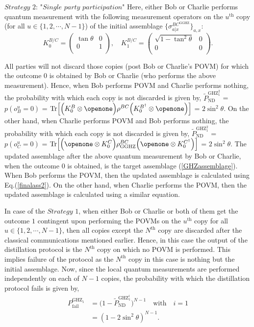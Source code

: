 \documentclass[reprint,superscriptaddress,nofootinbib,amsmath,amssymb,aps,pra,longbibliography]{revtex4-1}
\begin{document}
$\textit{Strategy 2: "Single party participation"}$ Here, either Bob or Charlie performs quantum measurement with the following measurement operators on the $u^{\text{th}}$ copy (for all $u \in \{1, 2, \cdots, N-1\}$) of the initial assemblage $\{\sigma_{a|x}^{BC^{\text{GGHZ}}}\}_{a,x}$:
\begin{equation}
	K_{0}^{B/C} = \left(
\begin{array}{cc}
 \tan \theta  & 0 \\
 0 & 1 \\
\end{array}
\right), \quad K_{1}^{B/C} =  \left(
\begin{array}{cc}
 \sqrt{1 - \tan^2 \theta}  & 0 \\
 0 & 0 \\
\end{array}
\right).
\label{GHZsteer2}
\end{equation}

 All parties will not discard those copies (post Bob or Charlie's POVM) for which the outcome $0$ is obtained by Bob or Charlie (who performs the above measurement). Hence, when Bob performs POVM and Charlie performs nothing, the probability with which each copy is not discarded is given by, $\tilde{P}_{\text{ND}}^{\text{GHZ}_1^2}$ = $p(o^u_B=0)$ = $\text{Tr} \Big[ \Big(K_{0}^{B} \otimes \openone \Big) \rho^{BC} \Big(K_{0}^{B^{\dagger}} \otimes \openone \Big) \Big]$ = $2 \sin^2 \theta$. On the other hand, when Charlie performs POVM and Bob performs nothing, the probability with which each copy is not discarded is given by, $\tilde{P}_{\text{ND}}^{\text{GHZ}_1^2}$ = $p(o^u_C=0)$ = $\text{Tr} \Big[ \Big( \openone \otimes K_{0}^{C} \Big) \rho_{\text{GGHZ}}^{BC} \Big( \openone \otimes K_{0}^{C^{\dagger}} \Big) \Big]$ = $2 \sin^2 \theta$. The updated assemblage after the above quantum measurement by Bob or Charlie, when the outcome $0$ is obtained, is the target assemblage (\ref{GHZassemblage}). When Bob performs the POVM, then the updated assemblage is calculated using Eq.(\ref{finalass2}). On the other hand, when Charlie performs the POVM, then the updated assemblage is calculated using a similar equation.

 In case of the $\textit{Strategy 1}$, when either Bob or Charlie or both of them get the outcome $1$ contingent upon performing the POVMs on the $u^{\text{th}}$ copy for all $u \in \{1, 2, \cdots, N-1\}$, then all copies except the $N^{\text{th}}$ copy are discarded after the classical communications mentioned earlier. Hence, in this case the output of the distillation protocol is the $N^{\text{th}}$ copy on which no POVM is performed. This implies failure of the protocol as the $N^{\text{th}}$ copy in this case is nothing but the initial assemblage. Now, since the local quantum measurements are performed independently on each of $N-1$ copies, the  probability with which the distillation protocol fails is given by,
\begin{align}
 P^{\text{GHZ}_1}_{\text{fail}} &= \big(1- \tilde{P}_{\text{ND}}^{\text{GHZ}_1^i} \big)^{N-1}   \quad \text{with} \quad i=1 \nonumber \\
 &=(1-2\sin^2\theta)^{N-1}.
\end{align} 
\end{document}
